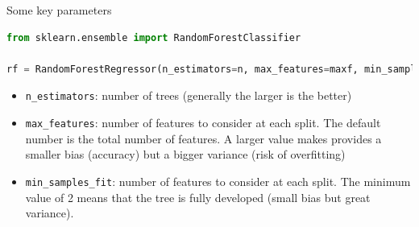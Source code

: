 \documentclass[handout]{beamer}
\begin{document}
\begin{frame}[fragile]{Some key parameters}
\begin{lstlisting}[language=Python]
from sklearn.ensemble import RandomForestClassifier

rf = RandomForestRegressor(n_estimators=n, max_features=maxf, min_samples_split=min_split,...)
\end{lstlisting}
\vspace{-1.5em}
\begin{itemize}[<+->]
    \item \verb|n_estimators|: number of trees (generally the larger is the better)
    \item   \verb|max_features|: number of features to consider at each split. The default number is the total number of features. A larger value makes provides a smaller bias (accuracy) but a bigger variance (risk of overfitting)
      \item \verb|min_samples_fit|: number of features to consider at each split. The minimum value of 2 means that the tree is fully developed (small bias but great variance).
\end{itemize}

\end{frame}
\end{document}
